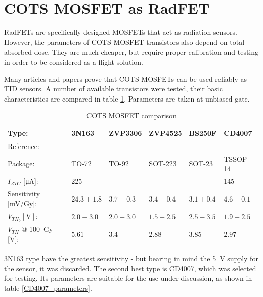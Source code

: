 \section{COTS MOSFET as RadFET}
    RadFETs are specifically designed MOSFETs that act as radiation sensors. However, the parameters of COTS MOSFET transistors also depend on total absorbed dose. They are much cheaper, but require proper calibration and testing in order to be considered as a flight solution.

    Many articles and papers prove that COTS MOSFETs can be used reliably as TID sensors. A number of available transistors were tested, their basic characteristics are compared in table \ref{cots_mosfet_comparison}. Parameters are taken at unbiased gate.

    \begin{table}[H]
    \begin{tabular}{| L{2cm} | C{2.4cm} | C{2.4cm} | C{2.4cm} | C{2.4cm} | C{2.4cm} |}
        \hline
        Type: & 3N163 & ZVP3306 & ZVP4525 & BS250F & CD4007 \\ \hline
        Reference: & \cite{3N163_article} & \cite{COTSMosfetsGarcia} & \cite{COTSMosfetsGarcia} & \cite{COTSMosfetsGarcia} & \cite{COTSMosfetsGarcia} \\ \hline

        Package: & TO-72 & TO-92 & SOT-223 & SOT-23 & TSSOP-14 \\ \hline

        $I_{ZTC}$ [\si{\micro\ampere}]: & 225 & - & - & - & 145 \\ \hline

        Sensitivity [\si{\milli\volt/\gray}]: & $24.3\pm 1.8$ & $3.7\pm 0.3$ & $3.4\pm 0.4$ & $3.1\pm 0.4$ & $4.6\pm 0.1$ \\ \hline

        $V_{TH_0} [\si{\volt}]$: & $2.0 - 3.0$ & $2.0 - 3.0$ & $1.5 - 2.5$ & $2.5 - 3.5$ & $1.9 - 2.5$ \\ \hline

        $V_{TH}$ @ \SI{100}{\gray} [\si{\volt}]: & $5.61$ & $3.4$ & $2.88$ & $3.85$ & $2.97$ \\ \hline
    \end{tabular}
    \caption{COTS MOSFET comparison}
    \label{cots_mosfet_comparison}
    \end{table}

    3N163 type have the greatest sensitivity - but bearing in mind the \SI{5}{\volt} supply for the sensor, it was discarded. The second best type is CD4007, which was selected for testing. Its parameters are suitable for the use under discussion, as shown in table \ref{CD4007_parameters}.

